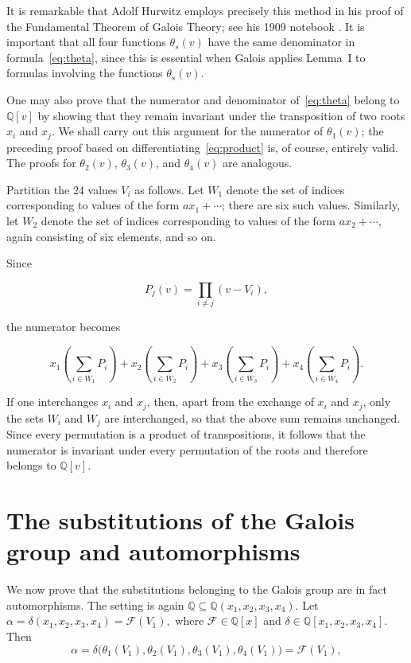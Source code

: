 \documentclass[a4paper,11pt]{article}
\begin{document}
 It is remarkable that Adolf Hurwitz employs precisely this method in his proof of the Fundamental Theorem of Galois Theory; see his 1909 notebook \cite[pp.~153--154]{Hurdag}. It is important that all four functions \(\theta_s(v)\) have the same denominator in formula~\eqref{eq:theta}, since this is essential when Galois applies Lemma~I to formulas involving the functions \(\theta_s(v)\).
 
 One may also prove that the numerator and denominator of~\eqref{eq:theta} belong to \(\mathbb{Q}[v]\) by showing that they remain invariant under the transposition of two roots \(x_i\) and \(x_j\). We shall carry out this argument for the numerator of \(\theta_1(v)\); the preceding proof based on differentiating~\eqref{eq:product} is, of course, entirely valid. The proofs for \(\theta_2(v)\), \(\theta_3(v)\), and \(\theta_4(v)\) are analogous.
 
 Partition the \(24\) values \(V_i\) as follows. Let \(W_1\) denote the set of indices corresponding to values of the form \(ax_1+\cdots\); there are six such values. Similarly, let \(W_2\) denote the set of indices corresponding to values of the form \(ax_2+\cdots\), again consisting of six elements, and so on.
 
 Since
 
 \[
 P_j(v)
 =
 \prod_{i\neq j}(v-V_i),
 \]
 
 the numerator becomes
 
 \[
 x_1\!\left(\sum_{i\in W_1}P_i\right)
 +
 x_2\!\left(\sum_{i\in W_2}P_i\right)
 +
 x_3\!\left(\sum_{i\in W_3}P_i\right)
 +
 x_4\!\left(\sum_{i\in W_4}P_i\right).
 \]
 
 If one interchanges \(x_i\) and \(x_j\), then, apart from the exchange of \(x_i\) and \(x_j\), only the sets \(W_i\) and \(W_j\) are interchanged, so that the above sum remains unchanged. Since every permutation is a product of transpositions, it follows that the numerator is invariant under every permutation of the roots and therefore belongs to \(\mathbb{Q}[v]\).
 
 \section{The substitutions of the Galois group and automorphisms}
 \label{sec:subaut}
 
 We now prove that the substitutions belonging to the Galois group are in fact automorphisms. The setting is again
  \(
 \mathbb{Q}\subseteq\mathbb{Q}(x_1,x_2,x_3,x_4).
 \)
  Let
  \(
 \alpha=\delta(x_1,x_2,x_3,x_4)=\mathcal{F}(V_1),
 \) 
 where \(\mathcal{F}\in\mathbb{Q}[x]\) and
 \(\delta\in\mathbb{Q}[x_1,x_2,x_3,x_4]\). Then
  \[
 \alpha
 =
 \delta\!\bigl(\theta_1(V_1),\theta_2(V_1),
 \theta_3(V_1),\theta_4(V_1)\bigr)
 =
 \mathcal{F}(V_1),
 \]
 
\end{document}
